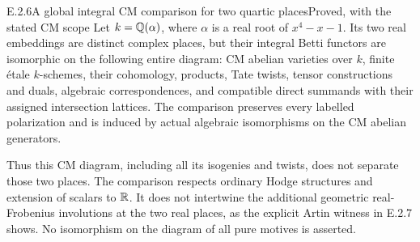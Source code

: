 \begin{result}{E.2.6}{A global integral CM comparison for two quartic places}{Proved, with the stated CM scope}
Let $k=\mathbb Q(\alpha)$, where $\alpha$ is a real root of $x^4-x-1$. Its two real embeddings are distinct complex places, but their integral Betti functors are isomorphic on the following entire diagram: CM abelian varieties over $k$, finite \'etale $k$-schemes, their cohomology, products, Tate twists, tensor constructions and duals, algebraic correspondences, and compatible direct summands with their assigned intersection lattices. The comparison preserves every labelled polarization and is induced by actual algebraic isomorphisms on the CM abelian generators.

Thus this CM diagram, including all its isogenies and twists, does not separate those two places. The comparison respects ordinary Hodge structures and extension of scalars to $\mathbb R$. It does not intertwine the additional geometric real-Frobenius involutions at the two real places, as the explicit Artin witness in E.2.7 shows. No isomorphism on the diagram of all pure motives is asserted.
\end{result}
